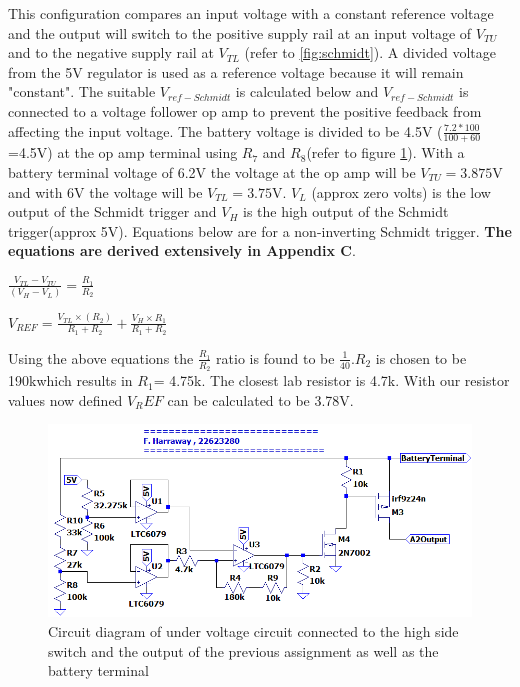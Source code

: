   This configuration compares an input voltage with a constant reference voltage and the output will switch to the positive supply rail at an input voltage of $V_{TU}$ and to the negative supply rail at $V_{TL}$ (refer to \ref{fig:schmidt}). A divided voltage from the 5V regulator is used as a reference voltage because it will remain "constant". The suitable $V_{ref-Schmidt}$ is calculated below and $V_{ref-Schmidt}$ is connected to a voltage follower op amp to prevent the positive feedback from affecting the input voltage. The battery voltage is divided to be 4.5V ($\frac{7.2*100}{100+60}$=4.5V) at the op amp terminal using $R_7$ and $R_8$(refer to figure \ref{fig:under}). With a battery terminal voltage of 6.2V the voltage at the op amp will be $V_{TU}=3.875$V and with 6V the voltage will be $V_{TL}=3.75$V. $V_L$ (approx zero volts) is the low output of the Schmidt trigger and $V_H$ is the high output of the Schmidt trigger(approx 5V). Equations below are for a non-inverting Schmidt trigger. \textbf{The equations are derived extensively in Appendix C}.



\begin{center}
	$\frac{V_{TL}-V_{TU}}{(V_{H}-V_L)}=\frac{R_1}{R_2}$  
\end{center}

\begin{center}
	
$	V_{REF}=\frac{V_{TL}\times (R_2)}{R_1+R_2}+\frac{V_{H}\times R_1}{R_1+R_2}$
\end{center}




Using the above equations the $\frac{R_1}{R_2}$ ratio is found to be $\frac{1}{40}$.$R_2$ is chosen to be 190k\textohm which results in $R_1$= 4.75k\textohm. The closest lab resistor is 4.7k\textohm. With our resistor values now defined $V_REF$ can be calculated to be 3.78V.



\begin{figure}[!htb]
\centering
\includegraphics[scale=0.5]{./Figures/undervoltage}
\caption{Circuit diagram of under voltage circuit connected to the high side switch and the output of the previous assignment as well as the battery terminal}
\label{fig:under}
\end{figure}


